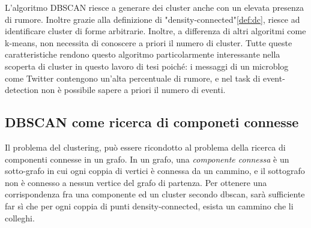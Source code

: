 \documentclass[a4paper,12pt]{report}
\begin{document}
L'algoritmo DBSCAN riesce  a generare dei cluster anche con un elevata presenza di rumore. Inoltre grazie alla definizione di "density-connected"\ref{def:dc}, riesce ad identificare cluster di forme arbitrarie. Inoltre, a differenza di altri algoritmi come k-means, non necessita di conoscere a priori il numero di cluster. Tutte queste caratteristiche rendono questo algoritmo particolarmente interessante nella scoperta di cluster in questo lavoro di tesi poiché: i messaggi di un microblog come Twitter contengono un'alta percentuale di rumore, e nel task di event-detection non è possibile sapere a priori il numero di eventi.
\subsection{DBSCAN come ricerca di componeti connesse }
Il problema del clustering, può essere ricondotto al problema della ricerca di componenti connesse in un grafo.
In un grafo, una \emph{componente connessa} è un sotto-grafo in cui ogni coppia di vertici è connessa da un cammino, e il sottografo non è connesso  a nessun vertice  del grafo di partenza. Per ottenere una corrispondenza fra una  componente ed  un cluster secondo dbscan, sarà sufficiente far sì che per ogni coppia di punti  density-connected, esista un cammino che li colleghi.
\end{document}

